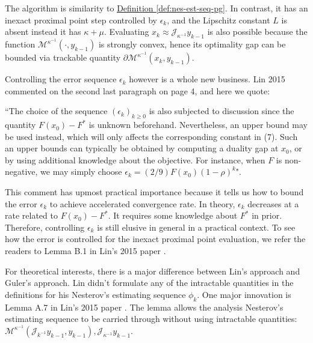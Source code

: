 \documentclass[12pt]{article}
\begin{document}
    \begin{remark}
        The algorithm is similarity to
        \hyperref[def:nes-est-seq-pg]{Definition \ref*{def:nes-est-seq-pg}}. 
        In contrast, it has an inexact proximal point step controlled by $\epsilon_k$, and the Lipschitz constant $L$ is absent instead it has $\kappa + \mu$. 
        Evaluating $x_k \approx \mathcal J_{\kappa^{-1}}y_{k - 1}$ is also possible because the function $\mathcal M^{\kappa^{-1}}(\cdot, y_{k - 1})$ is strongly convex, hence its optimality gap can be bounded via trackable quantity $\partial \mathcal M^{\kappa^{-1}}(x_k, y_{k - 1})$. 

        Controlling the error sequence $\epsilon_k$ however is a whole new business. 
        Lin 2015 \cite{lin_universal_2015} commented on the second last paragraph on page 4, and here we quote:
        \par
        ``The choice of the sequence $(\epsilon_k)_{k \ge 0}$ is also subjected to discussion since the quantity $F(x_0) - F^*$ is unknown beforehand. Nevertheless, an upper bound may be used instead, which will only affects the corresponding constant in (7). Such an upper bounds can typically be obtained by computing a duality gap at $x_0$, or by using additional knowledge about the objective. For instance, when $F$ is non-negative, we may simply choose $\epsilon_k = (2/9)F(x_0)(1 - \rho)^k$". 
        
        This comment has upmost practical importance because it tells us how to bound the error $\epsilon_k$ to achieve accelerated convergence rate. 
        In theory, $\epsilon_k$ decreases at a rate related to $F(x_0) - F^*$. 
        It requires some knowledge about $F^*$ in prior. 
        Therefore, controlling $\epsilon_k$ is still elusive in general in a practical context. 
        To see how the error is controlled for the inexact proximal point evaluation, we refer the readers to Lemma B.1 in Lin's 2015 paper \cite{lin_universal_2015}. 
    \end{remark}
    For theoretical interests, there is a major difference between Lin's approach and Guler's approach. 
    Lin didn't formulate any of the intractable quantities in the definitions for his Nesterov's estimating sequence $\phi_k$. 
    One major innovation is Lemma A.7 in Lin's 2015 paper \cite{lin_universal_2015}. 
    The lemma allows the analysis Nesterov's estimating sequence to be carried through without using intractable quantities: $\mathcal M^{\kappa^{-1}}(\mathcal J_{k^{-1}}y_{k - 1}, y_{k - 1}), \mathcal J_{\kappa^{-1}}y_{k - 1}$. 
\end{document}
